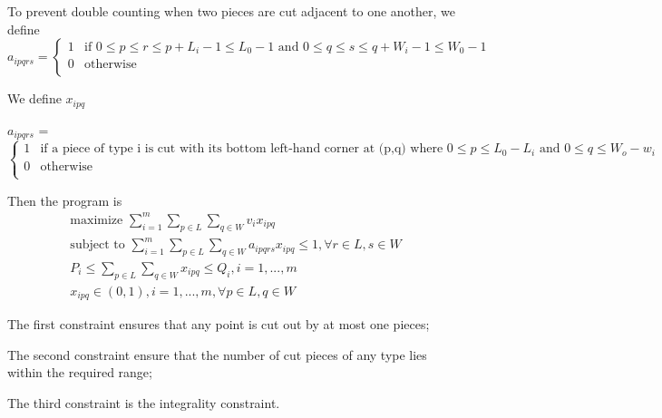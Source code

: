 \documentclass[10 pt,final]{article}
\begin{document}
To prevent double counting when two pieces are cut adjacent to one another, we define
\begin{displaymath}
a_{ipqrs} = 
\begin{cases} 
1 &\mbox{if $0 \leq p \leq r \leq p+L_i-1 \leq L_0 - 1$ and $0 \leq q \leq s \leq q+W_i-1 \leq W_0 -1$} \\ 
0 & \mbox{otherwise} \\
\end{cases} 
\end{displaymath}

We define $x_{ipq}$

$a_{ipqrs}$ = \\
\begin{displaymath}
\begin{cases} 
1 &\mbox{if a piece of type i is cut with its bottom left-hand corner at (p,q) where $0 \leq p \leq L_0 - L_i$ and $0 \leq q \leq W_o - w_i$} \\ 
0 & \mbox{otherwise} \\
\end{cases} 
\end{displaymath}



Then the program is 
\begin{align}
\mbox{maximize } \sum^m_{i=1} \sum_{p \in L} \sum_{q \in W} v_i x_{ipq} \\
\mbox{subject to } \sum^m_{i=1} \sum_{p \in L} \sum_{q \in W} a_{ipqrs} x_{ipq} \leq 1, \forall r \in L, s \in W \\
P_i \leq \sum_{p \in L} \sum_{q \in W} x_{ipq} \leq Q_i, i = 1, ..., m \\ 
x_{ipq} \in (0,1), i=1,..., m ,\forall p \in L, q \in W 
\end{align}

The first constraint ensures that any point is cut out by at most one pieces;

The second constraint ensure that the number of cut pieces of any type lies within the required range;

The third constraint is the integrality constraint.













\end{document}
